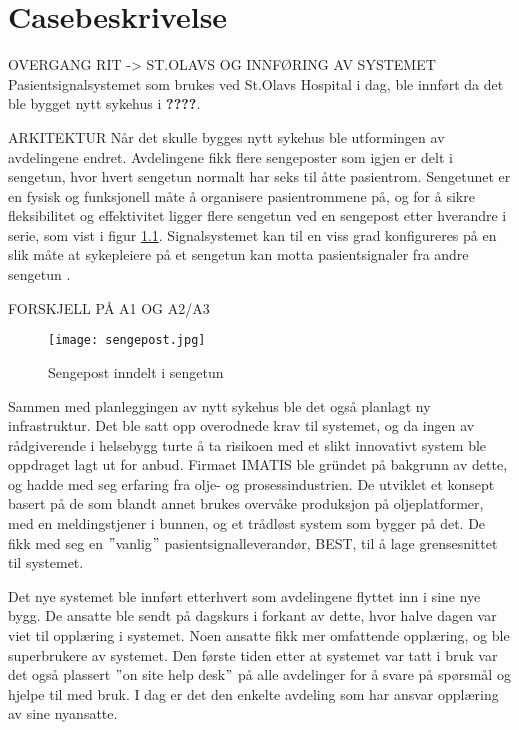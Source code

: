 \chapter{Casebeskrivelse}
\label{chp:case}

OVERGANG RIT -> ST.OLAVS OG INNFØRING AV SYSTEMET
Pasientsignalsystemet som brukes ved St.Olavs Hospital i dag, ble innført da det ble bygget nytt sykehus i \textbf{????}. 

\noindent
ARKITEKTUR
Når det skulle bygges nytt sykehus ble utformingen av avdelingene endret. Avdelingene fikk flere sengeposter som igjen er delt i sengetun, hvor hvert sengetun normalt har seks til åtte pasientrom. Sengetunet er en fysisk og funksjonell måte å organisere pasientrommene på, og for å sikre fleksibilitet og effektivitet ligger flere sengetun ved en sengepost etter hverandre i serie, som vist i figur \ref{fig:sengepost}. Signalsystemet kan til en viss grad konfigureres på en slik måte at sykepleiere på et sengetun kan motta pasientsignaler fra andre sengetun \citep{Aslaksen}.

FORSKJELL PÅ A1 OG A2/A3

\begin{figure}[H]
\centering
\texttt{[image: sengepost.jpg]}
\caption{Sengepost inndelt i sengetun \citep{Aslaksen}}
\label{fig:sengepost}
\end{figure}

\noindent
Sammen med planleggingen av nytt sykehus ble det også planlagt ny infrastruktur. Det ble satt opp overodnede krav til systemet, og da ingen av rådgiverende i helsebygg turte å ta risikoen med et slikt innovativt system ble oppdraget lagt ut for anbud. Firmaet IMATIS ble gründet på bakgrunn av dette, og hadde med seg erfaring fra olje- og prosessindustrien. De utviklet et konsept basert på de som blandt annet brukes overvåke produksjon på oljeplatformer, med en meldingstjener i bunnen, og et trådløst system som bygger på det. De fikk med seg en $"$vanlig$"$ pasientsignalleverandør, BEST, til å lage grensesnittet til systemet. 

\noindent
Det nye systemet ble innført etterhvert som avdelingene flyttet inn i sine nye bygg. De ansatte ble sendt på dagskurs i forkant av dette, hvor halve dagen var viet til opplæring i systemet. Noen ansatte fikk mer omfattende opplæring, og ble superbrukere av systemet. Den første tiden etter at systemet var tatt i bruk var det også plassert $"$on site help desk$"$ på alle avdelinger for å svare på spørsmål og hjelpe til med bruk. I dag er det den enkelte avdeling som har ansvar opplæring av sine nyansatte. 

